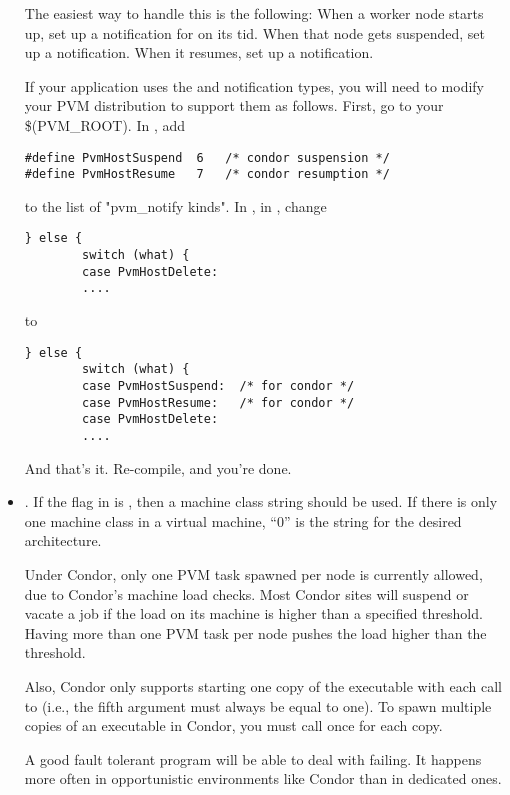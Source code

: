 \begin{itemize}
  The easiest way to handle this is the following:  When a worker
  node starts up, set up a notification for  on
  its tid.  When that node gets suspended, set up a 
  notification.  When it resumes, set up a 
  notification.

  If your application uses the  and
   notification types, you will need to modify
  your PVM distribution to support them as follows.  First, go to your
  \$(PVM\_ROOT). In , add
\begin{verbatim}
#define PvmHostSuspend  6   /* condor suspension */
#define PvmHostResume   7   /* condor resumption */
\end{verbatim}

  to the list of "pvm\_notify kinds".
  In , in , change 

\begin{verbatim}
} else {
        switch (what) {
        case PvmHostDelete:
        ....
\end{verbatim}
to 
\begin{verbatim}
} else {
        switch (what) {
        case PvmHostSuspend:  /* for condor */
        case PvmHostResume:   /* for condor */
        case PvmHostDelete:
        ....
\end{verbatim}
And that's it. Re-compile, and you're done. 


\item {}.  If the flag in  is 
  , then a machine class string 
  should be used.  If there is only one machine class
  in a virtual machine, ``0'' is the string for the desired architecture.

  Under Condor, only one
  PVM task spawned per node is currently allowed,
  due to Condor's machine load checks.
  Most Condor 
  sites will suspend or vacate
  a job if the load on its machine is higher than a specified
  threshold.
  Having more than one PVM task per node pushes the load
  higher than the threshold.

  Also, Condor only supports starting one copy of the executable with
  each call to  (i.e., the fifth argument must
  always be equal to one).  To spawn multiple copies of an executable
  in Condor, you must call  once for each copy.

  A good fault tolerant program will be able to deal with
   failing.  It happens more often in opportunistic 
  environments like Condor than in dedicated ones.


\end{itemize}
